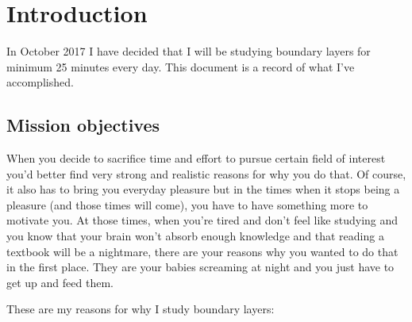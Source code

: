 \documentclass[12pt]{report}
\begin{document}

\setlength{\parindent}{0cm}

\clearpage


\tableofcontents



\setlength{\parskip}{1em}
\renewcommand{\baselinestretch}{1.0}


\newpage


\chapter{Introduction} \label{chap:intro}

In October 2017 I have decided that I will be studying boundary layers for minimum 25 minutes every day. This document is a record of what I've accomplished.


\section{Mission objectives} \label{chap:objectives}

When you decide to sacrifice time and effort to pursue certain field of interest you'd better find very strong and realistic reasons for why you do that. Of course, it also has to bring you everyday pleasure but in the times when it stops being a pleasure (and those times will come), you have to have something more to motivate you. At those times, when you're tired and don't feel like studying and you know that your brain won't absorb enough knowledge and that reading a textbook will be a nightmare, there are your reasons why you wanted to do that in the first place. They are your babies screaming at night and you just have to get up and feed them.

These are my reasons for why I study boundary layers:
\end{document}
